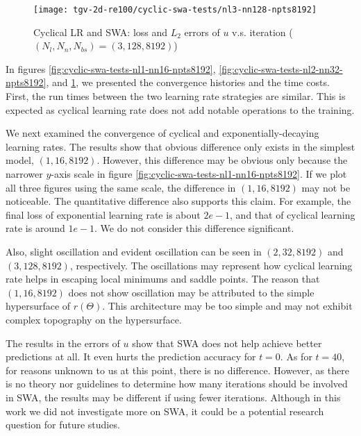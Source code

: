 \begin{figure}[hbt!]
    \centering%
    \texttt{[image: tgv-2d-re100/cyclic-swa-tests/nl3-nn128-npts8192]}%
    \caption[%
        Cyclical LR and SWA: loss and $L_2$ errors of $u$ v.s. iteration ($(N_l, N_n, N_{bs})=(3, 128, 8192)$)%
    ]{%
        Cyclical LR and SWA: loss and $L_2$ errors of $u$ v.s. iteration ($(N_l, N_n, N_{bs})=(3, 128, 8192)$)%
    }\label{fig:cyclic-swa-tests-nl3-nn128-npts8192}%
\end{figure}

In figures \ref{fig:cyclic-swa-tests-nl1-nn16-npts8192}, \ref{fig:cyclic-swa-tests-nl2-nn32-npts8192}, and \ref{fig:cyclic-swa-tests-nl3-nn128-npts8192}, we presented the convergence histories and the time costs.
First, the run times between the two learning rate strategies are similar.
This is expected as cyclical learning rate does not add notable operations to the training.

We next examined the convergence of cyclical and exponentially-decaying learning rates.
The results show that obvious difference only exists in the simplest model, $(1, 16, 8192)$.
However, this difference may be obvious only because the narrower $y$-axis scale in figure \ref{fig:cyclic-swa-tests-nl1-nn16-npts8192}.
If we plot all three figures using the same scale, the difference in $(1, 16, 8192)$ may not be noticeable.
The quantitative difference also supports this claim.
For example, the final loss of exponential learning rate is about $2e-1$, and that of cyclical learning rate is around $1e-1$.
We do not consider this difference significant.

Also, slight oscillation and evident oscillation can be seen in $(2, 32, 8192)$ and $(3, 128, 8192)$, respectively. 
The oscillations may represent how cyclical learning rate helps in escaping local minimums and saddle points. 
The reason that $(1, 16, 8192)$ does not show oscillation may be attributed to the simple hypersurface of $r(\Theta)$.
This architecture may be too simple and may not exhibit complex topography on the hypersurface.

The results in the errors of $u$ show that SWA does not help achieve better predictions at all.
It even hurts the prediction accuracy for $t=0$.
As for $t=40$, for reasons unknown to us at this point, there is no difference.
However, as there is no theory nor guidelines to determine how many iterations should be involved in SWA, the results may be different if using fewer iterations.
Although in this work we did not investigate more on SWA, it could be a potential research question for future studies.

